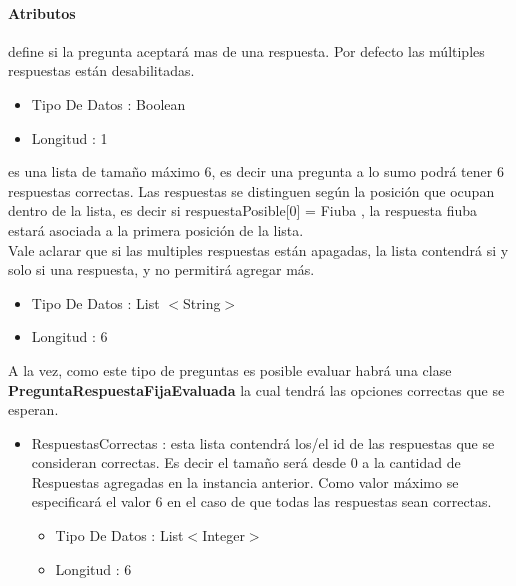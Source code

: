 \documentclass{article}
\begin{document}
\paragraph{\large{Atributos}}

\begin{description}

\item[m\'ultiplesRespuestas] define si la pregunta aceptar\'a mas de una respuesta. Por defecto las m\'ultiples respuestas est\'an desabilitadas.
\begin{itemize}
\item Tipo De Datos : Boolean
\item Longitud : 1
\end{itemize}
\item[respuestasPosibles] es una lista de tamaño m\'aximo 6, es decir una pregunta a lo sumo podr\'a tener 6 respuestas correctas. Las respuestas se distinguen seg\'un la posici\'on que ocupan dentro de la lista, es decir si respuestaPosible[0] = Fiuba , la respuesta fiuba estar\'a asociada a la primera posici\'on de la lista.\\
Vale aclarar que si las multiples respuestas est\'an apagadas, la lista contendr\'a si y solo si una respuesta, y no permitir\'a agregar m\'as.\\
\begin{itemize}
\item Tipo De Datos : List $<$String$>$
\item Longitud : 6
\end{itemize} 
\item A la vez, como este tipo de preguntas es posible evaluar habr\'a una clase \textbf{PreguntaRespuestaFijaEvaluada} la cual tendr\'a las opciones correctas que se esperan.\\

\begin{itemize}
	\item RespuestasCorrectas : esta lista contendr\'a los/el id de las respuestas que se consideran correctas. Es decir el tamaño ser\'a desde 0 a la cantidad de Respuestas agregadas en la instancia anterior. Como valor m\'aximo se especificar\'a el valor 6 en el caso de que todas las respuestas sean correctas.
	\begin{itemize}
\item Tipo De Datos : List$<$Integer$>$
\item Longitud : 6
\end{itemize} 
\end{itemize}

\end{description}
\end{document}
